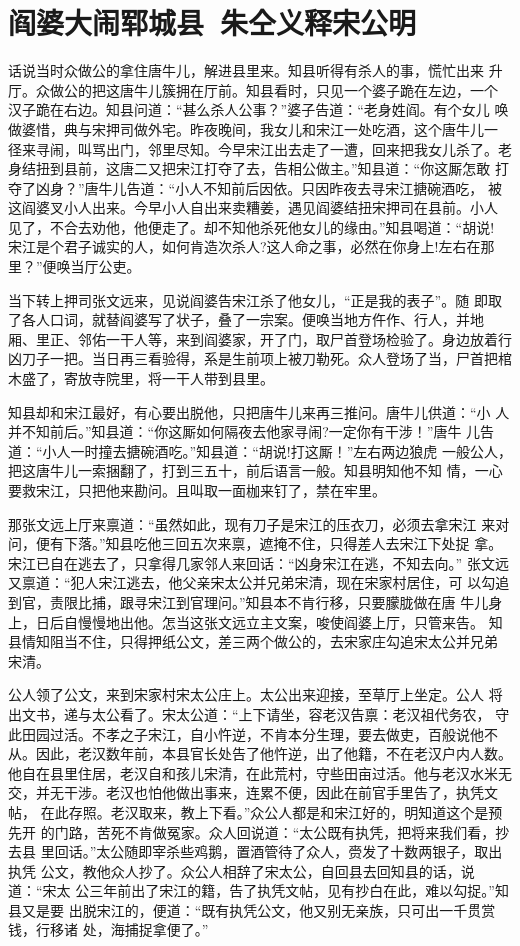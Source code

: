 \chapter{阎婆大闹郓城县~朱仝义释宋公明}

话说当时众做公的拿住唐牛儿，解进县里来。知县听得有杀人的事，慌忙出来
升厅。众做公的把这唐牛儿簇拥在厅前。知县看时，只见一个婆子跪在左边，一个
汉子跪在右边。知县问道：“甚么杀人公事？”婆子告道：“老身姓阎。有个女儿
唤做婆惜，典与宋押司做外宅。昨夜晚间，我女儿和宋江一处吃酒，这个唐牛儿一
径来寻闹，叫骂出门，邻里尽知。今早宋江出去走了一遭，回来把我女儿杀了。老
身结扭到县前，这唐二又把宋江打夺了去，告相公做主。”知县道：“你这厮怎敢
打夺了凶身？”唐牛儿告道：“小人不知前后因依。只因昨夜去寻宋江搪碗酒吃，
被这阎婆叉小人出来。今早小人自出来卖糟姜，遇见阎婆结扭宋押司在县前。小人
见了，不合去劝他，他便走了。却不知他杀死他女儿的缘由。”知县喝道：“胡说!
宋江是个君子诚实的人，如何肯造次杀人?这人命之事，必然在你身上!左右在那
里？”便唤当厅公吏。

当下转上押司张文远来，见说阎婆告宋江杀了他女儿，“正是我的表子”。随
即取了各人口词，就替阎婆写了状子，叠了一宗案。便唤当地方仵作、行人，并地
厢、里正、邻佑一干人等，来到阎婆家，开了门，取尸首登场检验了。身边放着行
凶刀子一把。当日再三看验得，系是生前项上被刀勒死。众人登场了当，尸首把棺
木盛了，寄放寺院里，将一干人带到县里。

知县却和宋江最好，有心要出脱他，只把唐牛儿来再三推问。唐牛儿供道：“小
人并不知前后。”知县道：“你这厮如何隔夜去他家寻闹?一定你有干涉！”唐牛
儿告道：“小人一时撞去搪碗酒吃。”知县道：“胡说!打这厮！”左右两边狼虎
一般公人，把这唐牛儿一索捆翻了，打到三五十，前后语言一般。知县明知他不知
情，一心要救宋江，只把他来勘问。且叫取一面枷来钉了，禁在牢里。

那张文远上厅来禀道：“虽然如此，现有刀子是宋江的压衣刀，必须去拿宋江
来对问，便有下落。”知县吃他三回五次来禀，遮掩不住，只得差人去宋江下处捉
拿。宋江已自在逃去了，只拿得几家邻人来回话：“凶身宋江在逃，不知去向。”
张文远又禀道：“犯人宋江逃去，他父亲宋太公并兄弟宋清，现在宋家村居住，可
以勾追到官，责限比捕，跟寻宋江到官理问。”知县本不肯行移，只要朦胧做在唐
牛儿身上，日后自慢慢地出他。怎当这张文远立主文案，唆使阎婆上厅，只管来告。
知县情知阻当不住，只得押纸公文，差三两个做公的，去宋家庄勾追宋太公并兄弟
宋清。

公人领了公文，来到宋家村宋太公庄上。太公出来迎接，至草厅上坐定。公人
将出文书，递与太公看了。宋太公道：“上下请坐，容老汉告禀：老汉祖代务农，
守此田园过活。不孝之子宋江，自小忤逆，不肯本分生理，要去做吏，百般说他不
从。因此，老汉数年前，本县官长处告了他忤逆，出了他籍，不在老汉户内人数。
他自在县里住居，老汉自和孩儿宋清，在此荒村，守些田亩过活。他与老汉水米无
交，并无干涉。老汉也怕他做出事来，连累不便，因此在前官手里告了，执凭文帖，
在此存照。老汉取来，教上下看。”众公人都是和宋江好的，明知道这个是预先开
的门路，苦死不肯做冤家。众人回说道：“太公既有执凭，把将来我们看，抄去县
里回话。”太公随即宰杀些鸡鹅，置酒管待了众人，赍发了十数两银子，取出执凭
公文，教他众人抄了。众公人相辞了宋太公，自回县去回知县的话，说道：“宋太
公三年前出了宋江的籍，告了执凭文帖，见有抄白在此，难以勾捉。”知县又是要
出脱宋江的，便道：“既有执凭公文，他又别无亲族，只可出一千贯赏钱，行移诸
处，海捕捉拿便了。”

